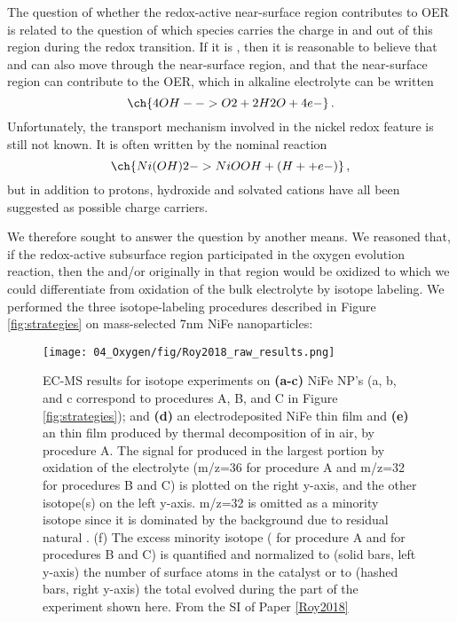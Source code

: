 The question of whether the redox-active near-surface region contributes to OER is related to the question of which species carries the charge in and out of this region during the redox transition. If it is , then it is reasonable to believe that  and  can also move through the near-surface region, and that the near-surface region can contribute to the OER, which in alkaline electrolyte can be written
\begin{equation}
\ch{4 OH- -> O2 + 2 H2O + 4 e-}\,.\label{rxn:OER_alkaline}
\end{equation}
Unfortunately, the transport mechanism involved in the nickel redox feature is still not known\cite{Dionigi2016b}. It is often written by the nominal reaction 
\begin{equation}
\ch{Ni(OH)2 -> NiOOH + (H+ + e- )}\,,\label{rxn:Ni_redox}
\end{equation}
but in addition to protons, hydroxide and solvated cations have all been suggested as possible charge carriers\cite{WehrensDijksma2006}.

We therefore sought to answer the question by another means. We reasoned that, if the redox-active subsurface region participated in the oxygen evolution reaction, then the  and/or  originally in that region would be oxidized to  which we could differentiate from oxidation of the bulk electrolyte by isotope labeling. We performed the three isotope-labeling procedures described in Figure \ref{fig:strategies} on mass-selected 7nm NiFe nanoparticles:


\begin{figure}[h!]
	\centering
	\texttt{[image: 04\_Oxygen/fig/Roy2018\_raw\_results.png]}
	\caption{EC-MS results for isotope experiments on \textbf{(a-c)} NiFe NP’s (a, b, and c correspond to procedures A, B, and C in Figure \ref{fig:strategies}); and \textbf{(d)} an electrodeposited NiFe thin film and \textbf{(e)} an  thin film produced by thermal decomposition of  in air, by procedure A. The signal for  produced in the largest portion by oxidation of the electrolyte (m/z=36 for procedure A and m/z=32 for procedures B and C) is plotted on the right y-axis, and the other  isotope(s) on the left y-axis. m/z=32 is omitted as a minority isotope since it is dominated by the background due to residual natural . (f) The excess minority isotope ( for procedure A and  for procedures B and C) is quantified and normalized to (solid bars, left y-axis) the number of surface atoms in the catalyst or to (hashed bars, right y-axis) the total  evolved during the part of the experiment shown here. From the SI of Paper \ref{Roy2018}}
	\label{fig:Roy2018_raw_results}
\end{figure}

